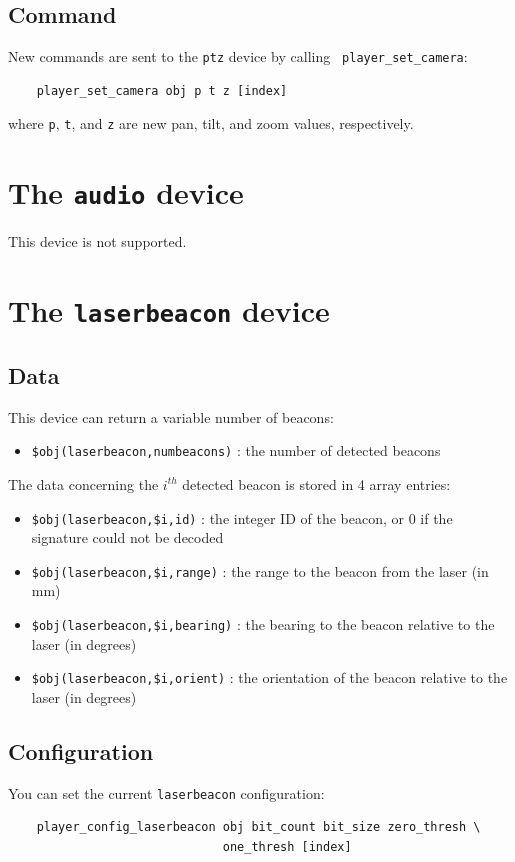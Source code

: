 \documentclass[11pt]{article}
\begin{document}
\subsection{Command}
New commands are sent to the {\tt ptz} device by calling {\tt
player\_set\_camera}:
\begin{verbatim}
    player_set_camera obj p t z [index]
\end{verbatim}
where {\tt p}, {\tt t}, and {\tt z} are new pan, tilt, and zoom values,
respectively.

\section{The {\tt audio} device}
This device is not supported.

\section{The {\tt laserbeacon} device}
\subsection{Data}
This device can return a variable number of beacons:
\begin{itemize}
\item {\tt \$obj(laserbeacon,numbeacons)} : the number of detected beacons
\end{itemize}
The data concerning the $i^{th}$ detected beacon is stored in 4 array entries:
\begin{itemize}
\item {\tt \$obj(laserbeacon,\$i,id)} : the integer ID of the beacon, or 0 if 
the signature could not be decoded
\item {\tt \$obj(laserbeacon,\$i,range)} : the range to the beacon from the
laser (in mm)
\item {\tt \$obj(laserbeacon,\$i,bearing)} : the bearing to the beacon
relative to the laser (in degrees)
\item {\tt \$obj(laserbeacon,\$i,orient)} : the orientation of the beacon
relative to the laser (in degrees)
\end{itemize}

\subsection{Configuration}
You can set the current {\tt laserbeacon} configuration:
\begin{verbatim}
    player_config_laserbeacon obj bit_count bit_size zero_thresh \
                              one_thresh [index]
\end{verbatim}
\end{document}

